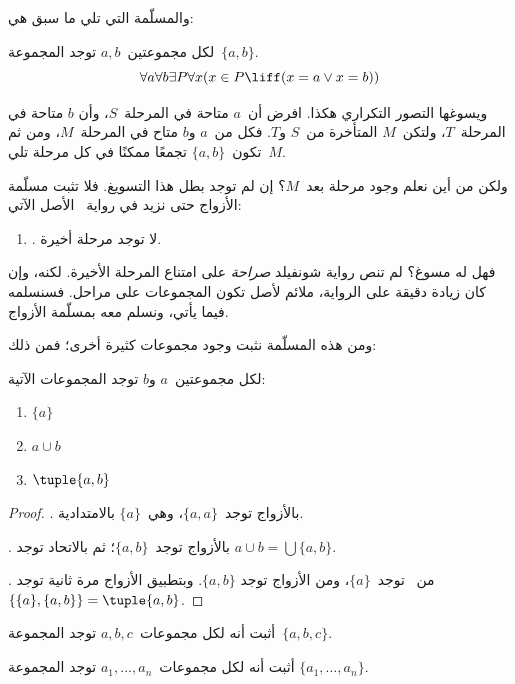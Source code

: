 \documentclass[../../../include/open-logic-section]{subfiles}
\begin{document}

والمسلّمة التي تلي ما سبق هي:

\begin{axiom}[الأزواج]
لكل مجموعتين~$a,b$ توجد المجموعة~$\{a,b\}$.
\[
	\forall a \forall b \exists P \forall x (x \in P \liff (x = a \lor x = b))
\]
\end{axiom}

ويسوغها التصور التكراري هكذا. افرض أن~$a$ متاحة في المرحلة~$S$، وأن
$b$ متاحة في المرحلة~$T$، ولتكن~$M$ المتأخرة من~$S$ و$T$. فكل من~$a$
و$b$ متاح في المرحلة~$M$، ومن ثم تكون~$\{a,b\}$ تجمعًا ممكنًا في كل
مرحلة تلي~$M$.

ولكن من أين نعلم وجود مرحلة بعد~$M$؟ إن لم توجد بطل هذا التسويغ. فلا
تثبت مسلّمة الأزواج حتى نزيد في رواية~
الأصل الآتي:
\begin{enumerate}
	\item[] \stagessucc. لا توجد مرحلة أخيرة.
\end{enumerate}
فهل له مسوغ؟ لم تنص رواية شونفيلد \emph{صراحة} على امتناع المرحلة
الأخيرة. لكنه، وإن كان زيادة دقيقة على الرواية، ملائم لأصل تكون
المجموعات على مراحل. فسنسلمه فيما يأتي، ونسلم معه بمسلّمة الأزواج.

ومن هذه المسلّمة نثبت وجود مجموعات كثيرة أخرى؛ فمن ذلك:

\begin{prop}
لكل مجموعتين~$a$ و$b$ توجد المجموعات الآتية:
	\begin{enumerate}
		\item{} $\{a\}$
		\item{} $a \cup b$
		\item{} $\tuple{a, b}$
	\end{enumerate}
\end{prop}

\begin{proof}
. بالأزواج توجد~$\{a, a\}$، وهي~$\{a\}$
بالامتدادية.

. بالأزواج توجد~$\{a, b\}$؛ ثم بالاتحاد توجد
$a \cup b = \bigcup \{a, b\}$.

. من~ توجد~$\{a\}$، ومن الأزواج توجد
$\{a,b\}$. وبتطبيق الأزواج مرة ثانية توجد
$\{\{a\}, \{a, b\}\} = \tuple{a, b}$.
\end{proof}

\begin{prob}
أثبت أنه لكل مجموعات~$a,b,c$ توجد المجموعة~$\{a,b,c\}$.
\end{prob}

\begin{prob}
أثبت أنه لكل مجموعات~$a_1,\ldots,a_n$ توجد المجموعة
$\{a_1,\ldots,a_n\}$.
\end{prob}

\end{document}
